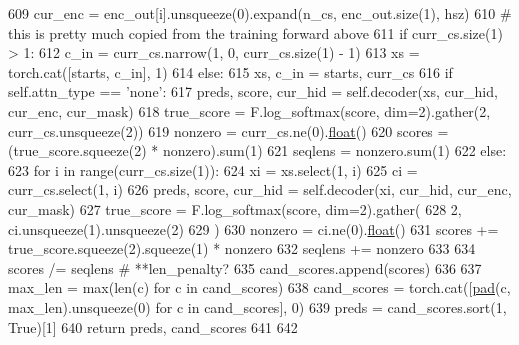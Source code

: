 \begin{DoxyCode}
609                 cur\_enc = enc\_out[i].unsqueeze(0).expand(n\_cs, enc\_out.size(1), hsz)
610             \textcolor{comment}{# this is pretty much copied from the training forward above}
611             \textcolor{keywordflow}{if} curr\_cs.size(1) > 1:
612                 c\_in = curr\_cs.narrow(1, 0, curr\_cs.size(1) - 1)
613                 xs = torch.cat([starts, c\_in], 1)
614             \textcolor{keywordflow}{else}:
615                 xs, c\_in = starts, curr\_cs
616             \textcolor{keywordflow}{if} self.attn\_type == \textcolor{stringliteral}{'none'}:
617                 preds, score, cur\_hid = self.decoder(xs, cur\_hid, cur\_enc, cur\_mask)
618                 true\_score = F.log\_softmax(score, dim=2).gather(2, curr\_cs.unsqueeze(2))
619                 nonzero = curr\_cs.ne(0).\hyperlink{namespaceprojects_1_1controllable__dialogue_1_1make__control__dataset_aa2b7207688c641dbc094ab44eca27113}{float}()
620                 scores = (true\_score.squeeze(2) * nonzero).sum(1)
621                 seqlens = nonzero.sum(1)
622             \textcolor{keywordflow}{else}:
623                 \textcolor{keywordflow}{for} i \textcolor{keywordflow}{in} range(curr\_cs.size(1)):
624                     xi = xs.select(1, i)
625                     ci = curr\_cs.select(1, i)
626                     preds, score, cur\_hid = self.decoder(xi, cur\_hid, cur\_enc, cur\_mask)
627                     true\_score = F.log\_softmax(score, dim=2).gather(
628                         2, ci.unsqueeze(1).unsqueeze(2)
629                     )
630                     nonzero = ci.ne(0).\hyperlink{namespaceprojects_1_1controllable__dialogue_1_1make__control__dataset_aa2b7207688c641dbc094ab44eca27113}{float}()
631                     scores += true\_score.squeeze(2).squeeze(1) * nonzero
632                     seqlens += nonzero
633 
634             scores /= seqlens  \textcolor{comment}{# **len\_penalty?}
635             cand\_scores.append(scores)
636 
637         max\_len = max(len(c) \textcolor{keywordflow}{for} c \textcolor{keywordflow}{in} cand\_scores)
638         cand\_scores = torch.cat([\hyperlink{namespaceparlai_1_1agents_1_1legacy__agents_1_1seq2seq_1_1modules__v0_afab760d03d96d6a368953b7173ea189a}{pad}(c, max\_len).unsqueeze(0) \textcolor{keywordflow}{for} c \textcolor{keywordflow}{in} cand\_scores], 0)
639         preds = cand\_scores.sort(1, \textcolor{keyword}{True})[1]
640         \textcolor{keywordflow}{return} preds, cand\_scores
641 
642 
\end{DoxyCode}


